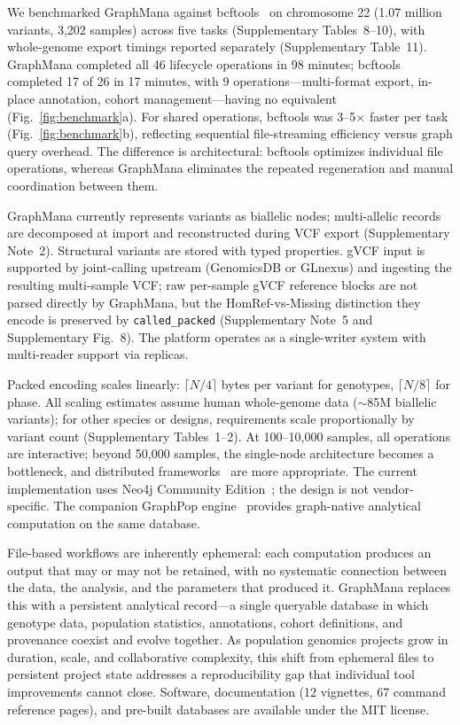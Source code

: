 \documentclass[pdflatex,sn-nature]{sn-jnl}
\begin{document}
We benchmarked GraphMana against bcftools~\cite{danecek2021bcftools} on chromosome 22 (1.07 million variants, 3,202 samples) across five tasks (Supplementary Tables~8--10), with whole-genome export timings reported separately (Supplementary Table~11). GraphMana completed all 46 lifecycle operations in 98 minutes; bcftools completed 17 of 26 in 17 minutes, with 9 operations---multi-format export, in-place annotation, cohort management---having no equivalent (Fig.~\ref{fig:benchmark}a). For shared operations, bcftools was 3--5$\times$ faster per task (Fig.~\ref{fig:benchmark}b), reflecting sequential file-streaming efficiency versus graph query overhead. The difference is architectural: bcftools optimizes individual file operations, whereas GraphMana eliminates the repeated regeneration and manual coordination between them.

GraphMana currently represents variants as biallelic nodes; multi-allelic records are decomposed at import and reconstructed during VCF export (Supplementary Note~2). Structural variants are stored with typed properties. gVCF input is supported by joint-calling upstream (GenomicsDB or GLnexus) and ingesting the resulting multi-sample VCF; raw per-sample gVCF reference blocks are not parsed directly by GraphMana, but the HomRef-vs-Missing distinction they encode is preserved by \texttt{called\_packed} (Supplementary Note~5 and Supplementary Fig.~8). The platform operates as a single-writer system with multi-reader support via replicas.

Packed encoding scales linearly: $\lceil N/4 \rceil$ bytes per variant for genotypes, $\lceil N/8 \rceil$ for phase. All scaling estimates assume human whole-genome data (${\sim}$85M biallelic variants); for other species or designs, requirements scale proportionally by variant count (Supplementary Tables~1--2). At 100--10,000 samples, all operations are interactive; beyond 50,000 samples, the single-node architecture becomes a bottleneck, and distributed frameworks~\cite{hail} are more appropriate. The current implementation uses Neo4j Community Edition~\cite{neo4j}; the design is not vendor-specific. The companion GraphPop engine~\cite{graphpop} provides graph-native analytical computation on the same database.

File-based workflows are inherently ephemeral: each computation produces an output that may or may not be retained, with no systematic connection between the data, the analysis, and the parameters that produced it. GraphMana replaces this with a persistent analytical record---a single queryable database in which genotype data, population statistics, annotations, cohort definitions, and provenance coexist and evolve together. As population genomics projects grow in duration, scale, and collaborative complexity, this shift from ephemeral files to persistent project state addresses a reproducibility gap that individual tool improvements cannot close. Software, documentation (12 vignettes, 67 command reference pages), and pre-built databases are available under the MIT license.
\end{document}
